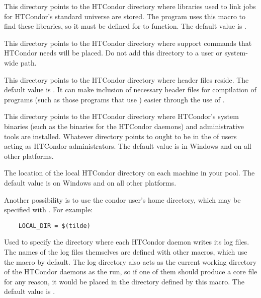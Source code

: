 \begin{description}
\label{param:Lib}
\item[\Macro{LIB}]
  This directory points to the
  HTCondor directory where libraries used to link jobs for HTCondor's
  standard universe are stored.  The  program uses
  this macro to find these libraries, so it must be defined for
   to function.
  The default value is .

\label{param:LibExec}
\item[\Macro{LIBEXEC}]
  This directory points
  to the HTCondor directory where support commands that HTCondor
  needs will be placed.
  Do not add this directory to a user or system-wide path.

\label{param:Include}
\item[\Macro{INCLUDE}]
  This directory points to the HTCondor directory where header files reside.
  The default value is .
  It can make inclusion of necessary header files
  for compilation of programs (such as those programs
  that use )
  easier through the use of .

\label{param:Sbin}
\item[\Macro{SBIN}]
  This directory points to the
  HTCondor directory where HTCondor's system binaries (such as the
  binaries for the HTCondor daemons) and administrative tools are
  installed.  Whatever directory  points to ought
  to be in the  of users acting as HTCondor
  administrators.
  The default value is  in Windows and
   on all other platforms.

\label{param:LocalDir}
\item[\Macro{LOCAL\_DIR}]
  The location of the
  local HTCondor directory on each machine in your pool.
  The default value is  on Windows and
   on all other
  platforms.
  
  Another possibility
  is to use the condor user's home directory, which may be
  specified with . For example:
  \begin{verbatim}
    LOCAL_DIR = $(tilde)
  \end{verbatim}

\label{param:Log}
\item[\Macro{LOG}]
  Used to specify the
  directory where each HTCondor daemon writes its log files.  The names
  of the log files themselves are defined with other macros, which use
  the  macro by default.  The log directory also acts as
  the current working directory of the HTCondor daemons as the run, so
  if one of them should produce a core file for any reason, it would
  be placed in the directory defined by this macro.
  The default value is .


\end{description}
